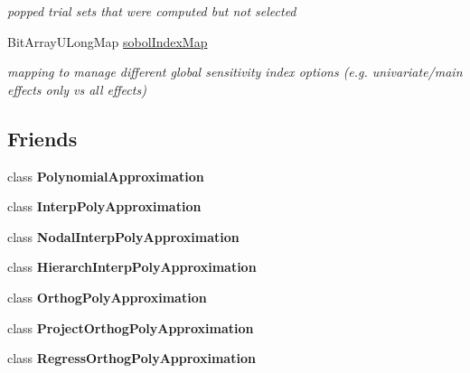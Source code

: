 \begin{DoxyCompactItemize}
\begin{DoxyCompactList}\small\item\em popped trial sets that were computed but not selected \end{DoxyCompactList}\item 
Bit\+Array\+U\+Long\+Map \hyperlink{classPecos_1_1SharedPolyApproxData_abc2d5cca0a7487b42d6e95beabc1863f}{sobol\+Index\+Map}\label{classPecos_1_1SharedPolyApproxData_abc2d5cca0a7487b42d6e95beabc1863f}

\begin{DoxyCompactList}\small\item\em mapping to manage different global sensitivity index options (e.\+g. univariate/main effects only vs all effects) \end{DoxyCompactList}\end{DoxyCompactItemize}
\subsection*{Friends}
\begin{DoxyCompactItemize}
\item 
class {\bfseries Polynomial\+Approximation}\label{classPecos_1_1SharedPolyApproxData_aa778674dbdc525b64e1dbd7e9d30e42b}

\item 
class {\bfseries Interp\+Poly\+Approximation}\label{classPecos_1_1SharedPolyApproxData_aafe9d45ff8baa100e0ebb9b2692540c7}

\item 
class {\bfseries Nodal\+Interp\+Poly\+Approximation}\label{classPecos_1_1SharedPolyApproxData_a99c7b13c38f494e387170b138587e3fb}

\item 
class {\bfseries Hierarch\+Interp\+Poly\+Approximation}\label{classPecos_1_1SharedPolyApproxData_ac5be928f91f05e9db6cfd416fb6abdb4}

\item 
class {\bfseries Orthog\+Poly\+Approximation}\label{classPecos_1_1SharedPolyApproxData_ad950e19c243902dbc8e6c49ca6ab5d2b}

\item 
class {\bfseries Project\+Orthog\+Poly\+Approximation}\label{classPecos_1_1SharedPolyApproxData_a9f89a24cc1d6d15a8e1a9a460171f142}

\item 
class {\bfseries Regress\+Orthog\+Poly\+Approximation}\label{classPecos_1_1SharedPolyApproxData_a7acecaa6278f4c25fb2eea8c89e541d9}

\end{DoxyCompactItemize}


